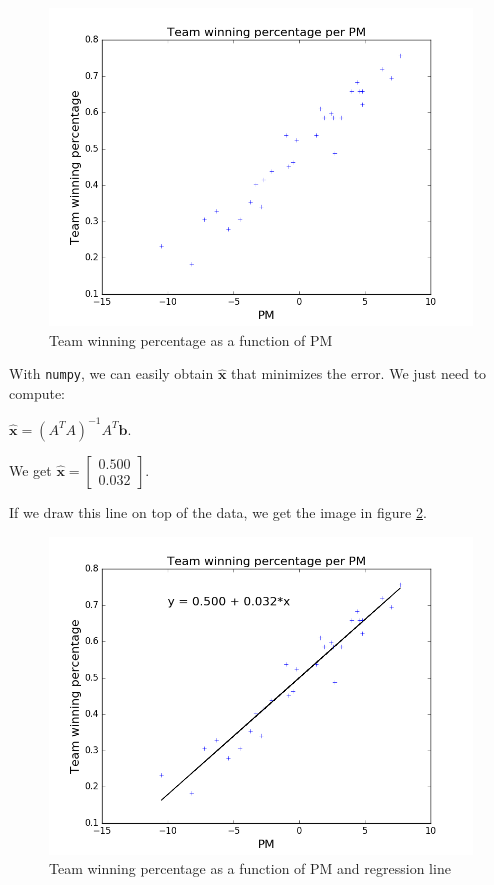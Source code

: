 \documentclass[]{article}
\begin{document}
\begin{figure}[h]
\centering
\includegraphics{nba_plain.png}
\caption{Team winning percentage as a function of PM}
\label{nba_plain}
\end{figure}

With \texttt{numpy}, we can easily obtain $\widehat{\textbf{x}}$ that minimizes the error. We just need to compute:

$\widehat{\textbf{x}} = (A^TA)^{-1}A^T\textbf{b}$.

We get $\widehat{\textbf{x}} = \left[\begin{smallmatrix}0.500\\0.032\end{smallmatrix}\right]$.

If we draw this line on top of the data, we get the image in figure \ref{nba_reg}.

\begin{figure}[h]
\centering
\includegraphics{nba_reg.png}
\caption{Team winning percentage as a function of PM and regression line}
\label{nba_reg}
\end{figure}
\end{document}
